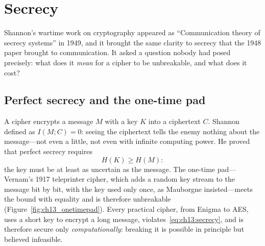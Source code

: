 \section{Secrecy}
\label{sec:ch13:secrecy}

Shannon's wartime work on cryptography appeared as ``Communication theory of secrecy systems'' in
1949, and it brought the same clarity to secrecy that the 1948 paper brought to communication. It
asked a question nobody had posed precisely: what does it \emph{mean} for a cipher to be
unbreakable, and what does it cost?

\subsection{Perfect secrecy and the one-time pad}

A cipher encrypts a message $M$ with a key $K$ into a ciphertext $C$. Shannon defined
 as $I(M;C)=0$: seeing the ciphertext tells the enemy nothing about the
message---not even a little, not even with infinite computing power. He proved that perfect
secrecy requires
\begin{equation}
H(K)\ge H(M):
\label{eq:ch13:secrecy}
\end{equation}
the key must be at least as uncertain as the message. The one-time pad---Vernam's 1917 teleprinter
cipher, which adds a random key stream to the message bit by bit, with the key used only once, as
Mauborgne insisted---meets the bound with equality and is therefore unbreakable
(Figure~\ref{fig:ch13_onetimepad}). Every practical cipher, from Enigma to AES, uses a short key to
encrypt a long message, violates~\eqref{eq:ch13:secrecy}, and is therefore secure only
\emph{computationally}: breaking it is possible in principle but believed infeasible.


